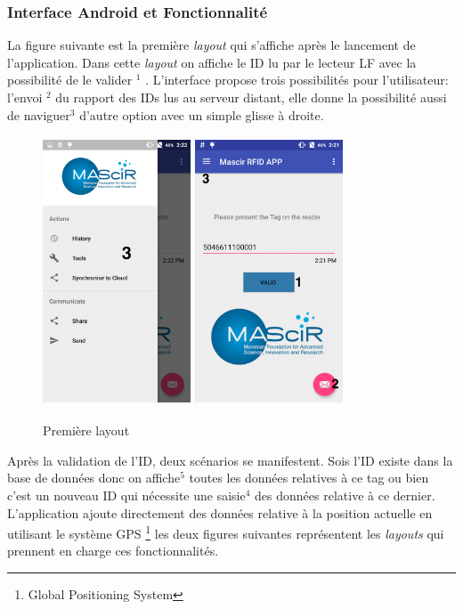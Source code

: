 \documentclass[11pt, a4paper, twoside]{book}
\begin{document}
\subsubsection{Interface Android et Fonctionnalité}
La figure suivante est la première \emph{layout} qui s'affiche après le lancement de l'application. Dans cette \emph{layout} on affiche le ID lu par le lecteur LF avec la possibilité de le valider \(^{1}\) . L'interface propose trois possibilités pour l'utilisateur: l'envoi \(^{2}\) du rapport des IDs lus au serveur distant, elle donne la possibilité aussi de naviguer\(^{3}\) d'autre option avec un simple glisse à droite.
\begin{figure}[H]
\centering
\includegraphics[width=4.4cm,height=8cm]{rightmenu}
\includegraphics[width=4.4cm,height=8cm]{1}
\caption{Première layout}
\end{figure}

Après la validation de l'ID, deux scénarios se manifestent. Sois l'ID existe dans la base de données donc on affiche\(^{5}\) toutes les données relatives à ce tag ou bien c'est un nouveau ID qui nécessite une saisie\(^{4}\) des données relative à ce dernier. L'application ajoute directement des données relative à la position actuelle en utilisant le système GPS \footnote{Global Positioning System} les deux figures suivantes représentent les \emph{layouts} qui prennent en charge ces fonctionnalités.
\end{document}

